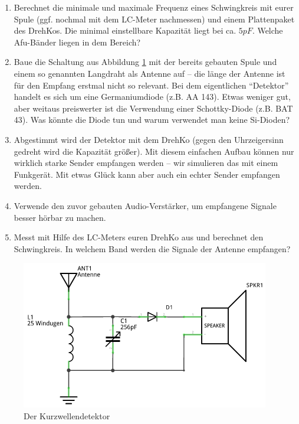 \begin{enumerate}
  \item Berechnet die minimale und maximale Frequenz eines Schwingkreis mit
    eurer Spule (ggf. nochmal mit dem LC-Meter nachmessen) und einem
    Plattenpaket des DrehKos. Die minimal einstellbare Kapazität liegt bei ca.
    $5 pF$. Welche Afu-Bänder liegen in dem Bereich?  
  \item Baue die Schaltung aus Abbildung \ref{kd} mit der bereits gebauten
    Spule und einem so genannten Langdraht als Antenne auf -- die länge der
    Antenne ist für den Empfang erstmal nicht so relevant. Bei dem
    eigentlichen "`Detektor"' handelt es sich um eine Germaniumdiode (z.B. AA
    143). Etwas weniger gut, aber weitaus preiswerter ist die Verwendung einer
    Schottky-Diode (z.B. BAT 43).  Was könnte die Diode tun und warum
    verwendet man keine Si-Dioden?
  \item Abgestimmt wird der Detektor mit dem DrehKo (gegen den Uhrzeigersinn
    gedreht wird die Kapazität größer). Mit diesem einfachen Aufbau können nur
    wirklich starke Sender empfangen werden -- wir simulieren das mit einem
    Funkgerät.  Mit etwas Glück kann aber auch ein echter Sender empfangen
    werden.
  \item Verwende den zuvor gebauten Audio-Verstärker, um empfangene Signale
    besser hörbar zu machen.
  \item Messt mit Hilfe des LC-Meters euren DrehKo aus und berechnet den
    Schwingkreis. In welchem Band werden die Signale der Antenne empfangen?
\end{enumerate}


\begin{figure}[H]
    \centering
    \includegraphics[scale=0.9]{Kurzwellendetektor/Bilder/Kurzwellendetektor_Schaltplan.pdf}
    \caption{Der Kurzwellendetektor}
    \label{kd}
\end{figure}

